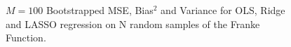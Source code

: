 \documentclass[reprint, english, nofootinbib]{revtex4-2}
\begin{document}
\begin{figure}
{     }
     \caption{$M = 100$ Bootstrapped MSE, Bias$^2$ and Variance for OLS, Ridge and LASSO regression on N random samples of the Franke Function.}
     \label{fig:franke_bootstraps}
\end{figure}



\end{document}
